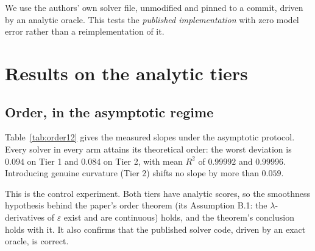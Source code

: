 \documentclass[11pt,a4paper]{article}
\newcommand{\eps}{\varepsilon}
\newcommand{\lam}{\lambda}
\begin{document}
We use the authors' own solver file, unmodified and pinned to a commit, driven by
an analytic oracle. This tests the \emph{published implementation} with zero
model error rather than a reimplementation of it.

\section{Results on the analytic tiers}

\subsection{Order, in the asymptotic regime}

Table~\ref{tab:order12} gives the measured slopes under the asymptotic protocol.
Every solver in every arm attains its theoretical order: the worst deviation is
$0.094$ on Tier 1 and $0.084$ on Tier 2, with mean $R^2$ of $0.99992$ and
$0.99996$. Introducing genuine curvature (Tier 2) shifts no slope by more than
$0.059$.

This is the control experiment. Both tiers have analytic scores, so the
smoothness hypothesis behind the paper's order theorem (its Assumption B.1:
the $\lam$-derivatives of $\eps$ exist and are continuous) holds, and the
theorem's conclusion holds with it. It also confirms that the published solver
code, driven by an exact oracle, is correct.
\end{document}
